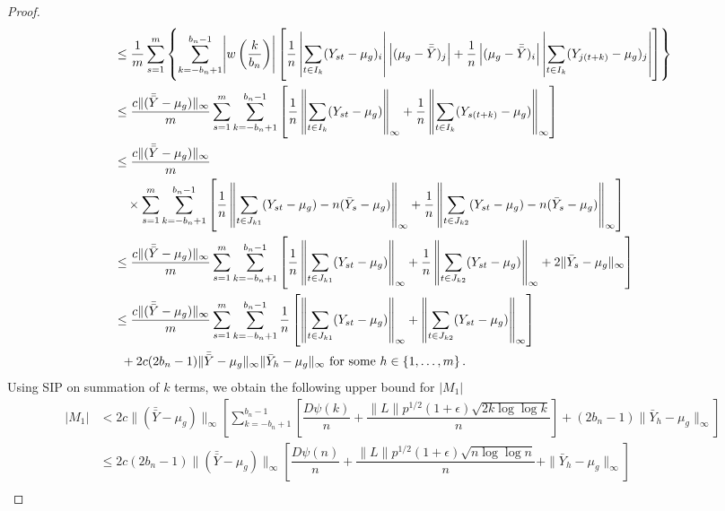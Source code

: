 \documentclass[11pt]{article}
\theoremstyle{remark}
\begin{document}
\begin{proof}
\begin{align*}
    & \leq \dfrac{1}{m}\sum_{s=1}^{m}\left\{\sum_{k=-b_n+1}^{b_n-1}\abs{w\left(\dfrac{k}{b_n}\right)}\left[ \dfrac{1}{n}\left|\sum_{t \in I_k}(Y_{st}- \mu_g)_i\right|\left|(\mu_g-\bar{\bar{Y}})_j\right|+ \dfrac{1}{n}\left|(\mu_g-\bar{\bar{Y}})_i\right|\left|\sum_{t \in I_k }(Y_{j(t+k)}-\mu_g)_j\right|\right]\right\}\\
    & \leq \dfrac{c\|(\bar{\bar{Y}} - \mu_g)\|_{\infty}}{m} \sum_{s=1}^{m}\sum\limits_{k=-b_n+1}^{b_n-1}\left[ \dfrac{1}{n}\left\|\sum_{t \in I_k}(Y_{st}-\mu_g)\right\|_{\infty} + \dfrac{1}{n}\left\|\sum_{t \in I_k}(Y_{s(t+k)}-\mu_g)\right\|_{\infty} \right]\\
    &\leq \dfrac{c\|(\bar{\bar{Y}} - \mu_g)\|_{\infty}}{m} \\
    & \quad \times \sum_{s=1}^{m}\sum_{k=-b_n+1}^{b_n-1}\left[ \dfrac{1}{n}\left\|\sum_{t \in J_{k1}}(Y_{st} - \mu_g) - n(\bar{Y}_s - \mu_g) \right\|_{\infty} + \dfrac{1}{n}\left\|\sum_{t \in J_{k2}}(Y_{st} - \mu_g) - n(\bar{Y}_s - \mu_g)\right\|_{\infty} \right]\\
    &\leq \dfrac{c\|(\bar{\bar{Y}} - \mu_g)\|_{\infty}}{m} \sum_{s=1}^{m}\sum\limits_{k=-b_n+1}^{b_n-1}\left[ \dfrac{1}{n}\left\|\sum_{t \in J_{k1}}(Y_{st} - \mu_g)\right\|_{\infty} + \dfrac{1}{n}\left\|\sum_{t \in J_{k2}}(Y_{st} - \mu_g)\right\|_{\infty} + 2\|\bar{Y}_s - \mu_g\|_{\infty} \right]\\
    & \leq \dfrac{c\|(\bar{\bar{Y}} - \mu_g)\|_{\infty}}{m} \sum\limits_{s=1}^{m}\sum_{k=-b_n + 1}^{b_n-1}   \dfrac{1}{n}\left[\left\|\sum_{t \in J_{k1}}(Y_{st} - \mu_g)\right\|_{\infty} + \left\|\sum_{t \in J_{k2}}(Y_{st} - \mu_g)\right\|_{\infty} \right]\\
    & \; \;+ 2c(2b_n - 1)\|\bar{\bar{Y}} - \mu_g\|_{\infty}\|\bar{Y}_h - \mu_g\|_{\infty} \textrm{ for some } h \in \{1, \dots, m\} \,.
\end{align*}
%
Using SIP on summation of $k$ terms, we obtain the following upper bound for $|M_1|$
\begin{align*}
|M_1|
    & < 2c\|(\bar{\bar{Y}} - \mu_g)\|_{\infty} \left[\sum\limits_{k=-b_n + 1}^{b_n-1}\left[ \dfrac{D \psi(k)}{n} + \dfrac{\|L\| p^{1/2}(1+\epsilon)\sqrt{2k \log\log k}}{n}  \right]  + (2b_n - 1) \|\bar{Y}_h - \mu_g\|_{\infty}  \right]\\
    &\leq 2c(2b_n - 1)\|(\bar{\bar{Y}} - \mu_g)\|_{\infty} \left[ \dfrac{D \psi(n)}{n} + \dfrac{\|L\| p^{1/2}(1+\epsilon)\sqrt{n \log\log n}}{n} + \|\bar{Y}_h - \mu_g\|_{\infty}  \right]\\

\end{align*}
\end{proof}
\end{document}
